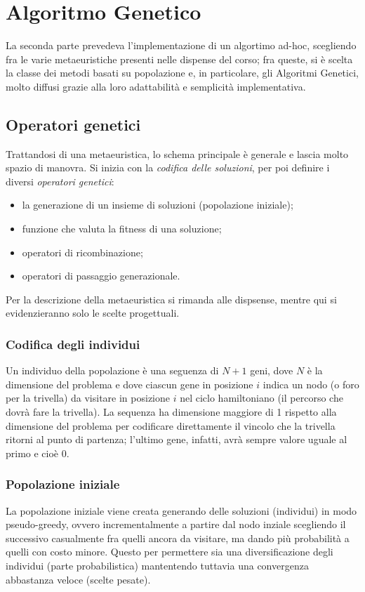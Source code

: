 
\section{Algoritmo Genetico}\label{sec:ga}
La seconda parte prevedeva l'implementazione di un algortimo ad-hoc, scegliendo fra le varie
metaeuristiche presenti nelle dispense del corso;
fra queste, si è scelta la classe dei metodi basati su popolazione e, in particolare, gli Algoritmi Genetici,
molto diffusi grazie alla loro adattabilità e semplicità implementativa.
\subsection{Operatori genetici}\label{subsec:operatori-genetici}
Trattandosi di una metaeuristica, lo schema principale è generale e lascia molto spazio di manovra.
Si inizia con la \textit{codifica delle soluzioni}, per poi definire i diversi \textit{operatori genetici}:
\begin{itemize}
	\item la generazione di un insieme di soluzioni (popolazione iniziale);
	\item funzione che valuta la fitness di una soluzione;
	\item operatori di ricombinazione;
	\item operatori di passaggio generazionale.
\end{itemize}
Per la descrizione della metaeuristica si rimanda alle dispsense, mentre qui si evidenzieranno
solo le scelte progettuali.
\subsubsection{Codifica degli individui}\label{subsubsec:codifica-individui}
Un individuo della popolazione è una seguenza di $N+1$ geni, dove $N$ è la dimensione del problema e
dove ciascun gene in posizione $i$ indica un nodo (o foro per la trivella) da visitare in posizione $i$
nel ciclo hamiltoniano (il percorso che dovrà fare la trivella).
La sequenza ha dimensione maggiore di 1 rispetto alla dimensione del problema per codificare direttamente
il vincolo che la trivella ritorni al punto di partenza; l'ultimo gene, infatti, avrà sempre valore uguale
al primo e cioè 0.
\subsubsection{Popolazione iniziale}\label{subsubsec:popolazione-inziale}
La popolazione iniziale viene creata generando delle soluzioni (individui) in modo pseudo-greedy, ovvero
incrementalmente a partire dal nodo inziale scegliendo il successivo casualmente fra quelli ancora da visitare,
ma dando più probabilità a quelli con costo minore.
Questo per permettere sia una diversificazione degli individui (parte probabilistica) mantentendo tuttavia
una convergenza abbastanza veloce (scelte pesate).

